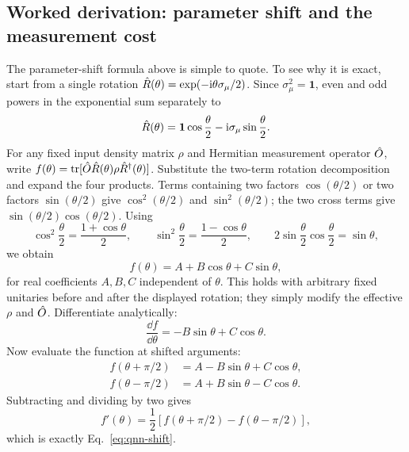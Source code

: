 \subsection*{Worked derivation: parameter shift and the measurement cost}
The parameter-shift formula above is simple to quote.
To see why it is exact, start from a single rotation
$\hat{R}(\theta)=\exp(-\mathrm{i}\theta\sigma_\mu/2)$.
Since $\sigma_\mu^2=\mathbf1$, even and odd powers in the
exponential sum separately to
\begin{equation}
\hat{R}(\theta)=\mathbf1\cos\frac\theta2
-\mathrm{i}\sigma_\mu\sin\frac\theta2.
\end{equation}
For any fixed input density matrix $\rho$ and Hermitian
measurement operator $\hat{O}$, write
$f(\theta)=\operatorname{tr}[\hat{O}\hat{R}(\theta)
\rho\hat{R}^\dagger(\theta)]$. Substitute the two-term
rotation decomposition and expand the four products.
Terms containing two factors $\cos(\theta/2)$ or two
factors $\sin(\theta/2)$ give
$\cos^2(\theta/2)$ and $\sin^2(\theta/2)$;
the two cross terms give
$\sin(\theta/2)\cos(\theta/2)$.
Using
\begin{equation}
\cos^2\frac\theta2=\frac{1+\cos\theta}2,\qquad
\sin^2\frac\theta2=\frac{1-\cos\theta}2,\qquad
2\sin\frac\theta2\cos\frac\theta2=\sin\theta,
\end{equation}
we obtain
\begin{equation}
f(\theta)=A+B\cos\theta+C\sin\theta,
\end{equation}
for real coefficients $A,B,C$ independent of $\theta$.
This holds with arbitrary fixed unitaries before and after
the displayed rotation; they simply modify the effective
$\rho$ and $\hat{O}$.
Differentiate analytically:
\begin{equation}
\frac{\dd f}{\dd\theta}=-B\sin\theta+C\cos\theta.
\end{equation}
Now evaluate the function at shifted arguments:
\begin{align}
f(\theta+\pi/2)&=A-B\sin\theta+C\cos\theta,\\
f(\theta-\pi/2)&=A+B\sin\theta-C\cos\theta.
\end{align}
Subtracting and dividing by two gives
\begin{equation}
\boxed{f'(\theta)=\frac12
\left[f(\theta+\pi/2)-f(\theta-\pi/2)\right],}
\end{equation}
which is exactly Eq.~\eqref{eq:qnn-shift}.

